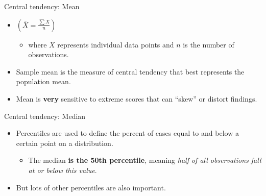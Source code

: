\documentclass[
  ignorenonframetext,
]{beamer}
\providecommand{\tightlist}{%
  \setlength{\itemsep}{0pt}\setlength{\parskip}{0pt}}
\begin{document}
\begin{frame}{Central tendency: Mean}
\label{central-tendency-mean}
\begin{itemize}
\tightlist
\item
  \(\left( \bar{X} = \frac{\sum X}{n} \right)\)

  \begin{itemize}
  \tightlist
  \item
    where \(X\) represents individual data points and \(n\) is the
    number of observations.
  \end{itemize}
\end{itemize}

\begin{itemize}
\tightlist
\item
  Sample mean is the measure of central tendency that best represents
  the population mean.
\end{itemize}

\begin{itemize}
\tightlist
\item
  Mean is \textbf{very} sensitive to extreme scores that can ``skew'' or
  distort findings.
\end{itemize}
\end{frame}

\begin{frame}{Central tendency: Median}
\label{central-tendency-median}
\begin{itemize}
\tightlist
\item
  Percentiles are used to define the percent of cases equal to and below
  a certain point on a distribution.

  \begin{itemize}
  \tightlist
  \item
    The median \textbf{is the 50th percentile}, meaning \emph{half of
    all observations fall at or below this value}.
  \end{itemize}
\end{itemize}

\begin{itemize}
\tightlist
\item
  But lots of other percentiles are also important.
\end{itemize}
\end{frame}
\end{document}
